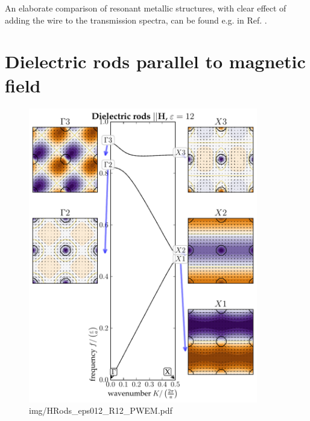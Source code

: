 
% 
An elaborate comparison of resonant metallic structures, with clear effect of adding the wire to the transmission spectra, can be found e.g. in Ref. \cite{koschny2004effective}.






\section{Dielectric rods parallel to magnetic field} %
\label{sect_diel_rods_mag}
\begin{figure} \caption{img/HRods\_eps012\_R12\_PWEM.pdf}  \centering \includegraphics[width=10cm]{img/HRods_eps012_R12_PWEM.pdf} \end{figure} \clearpage
